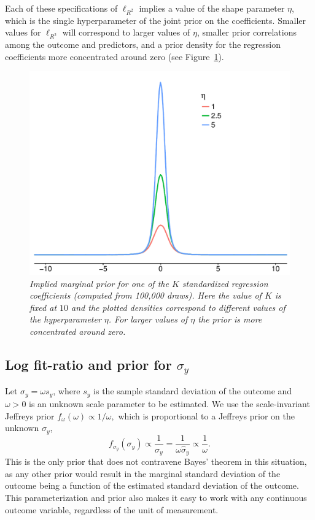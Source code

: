 \documentclass[11pt]{article}
\newcommand{\locRsq}{\ell_{R^2}}
\begin{document}
Each of these specifications of $\locRsq$ implies a value of the shape parameter
$\eta$, which is the single hyperparameter of the joint prior on the
coefficients. Smaller values for $\locRsq$ will correspond to larger values of
$\eta$, smaller prior correlations among the outcome and predictors, and a prior
density for the regression coefficients more concentrated around zero (see
Figure~\ref{fig:betaplot}).

\begin{figure}
\centering
\includegraphics[width=.67\textwidth]{betaplot.pdf}{\vspace{-.25cm}}
\caption{\em \small Implied marginal prior for one of the $K$ standardized
regression coefficients (computed from 100,000 draws). Here the value of $K$ is
fixed at $10$ and the plotted densities correspond to different values of the
hyperparameter $\eta$. For larger values of $\eta$ the prior is more
concentrated around zero.}
\label{fig:betaplot}
\end{figure}

\subsection{Log fit-ratio and prior for $\sigma_y$}
Let $\sigma_y = \omega s_y$, where $s_y$ is the sample standard deviation of the
outcome and $\omega > 0$ is an unknown scale parameter to be estimated. We use
the scale-invariant Jeffreys prior
$f_\omega \left(\omega\right) \propto 1 / \omega,$
which is proportional to a Jeffreys prior on the unknown $\sigma_y$,
$$f_{\sigma_y} \left(\sigma_y\right) \propto \frac{1}{\sigma_y}
= \frac{1}{\omega \widehat{\sigma}_y} \propto \frac{1}{\omega}.$$
This is the only prior that does not contravene Bayes' theorem in this
situation, as any other prior would result in the marginal standard deviation of
the outcome being a function of the estimated standard deviation of the outcome.
This parameterization and prior also makes it easy to work with any continuous
outcome variable, regardless of the unit of measurement.
\end{document}
